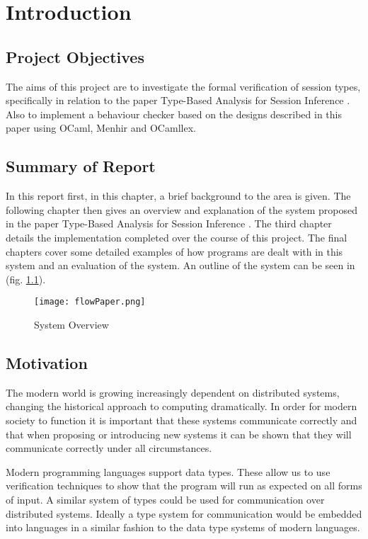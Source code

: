 \chapter{Introduction}

\section{Project Objectives}
The aims of this project are to investigate the formal verification of session types, specifically in relation to the paper Type-Based Analysis for Session Inference \cite{paper1}. Also to implement a behaviour checker based on the designs described in this paper using OCaml, Menhir and OCamllex. 

\section{Summary of Report}
In this report first, in this chapter, a brief background to the area is given. The following chapter then gives an overview and explanation of the system proposed in the paper Type-Based Analysis for Session Inference \cite{paper1}. The third chapter details the implementation completed over the course of this project. The final chapters cover some detailed examples of how programs are dealt with in this system and an evaluation of the system. An outline of the system can be seen in (fig. \ref{picSysOver}).

\begin{figure}
\centering
\texttt{[image: flowPaper.png]}
\caption{System Overview}
\label{picSysOver}
\end{figure}

\section{Motivation}
The modern world is growing increasingly dependent on distributed systems, changing the historical approach to computing dramatically. In order for modern society to function it is important that these systems communicate correctly and that when proposing or introducing new systems it can be shown that they will communicate correctly under all circumstances. 

Modern programming languages support data types. These allow us to use verification techniques to show that the program will run as expected on all forms of input. A similar system of types could be used for communication over distributed systems. Ideally a type system for communication would be embedded into languages in a similar fashion to the data type systems of modern languages.

